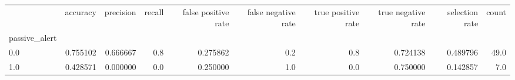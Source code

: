 \begin{tabular}{lrrrrrrrrr}
\toprule
{} &  accuracy &  precision &  recall &  false positive rate &  false negative rate &  true positive rate &  true negative rate &  selection rate &  count \\
passive\_alert &           &            &         &                      &                      &                     &                     &                 &        \\
\midrule
0.0           &  0.755102 &   0.666667 &     0.8 &             0.275862 &                  0.2 &                 0.8 &            0.724138 &        0.489796 &   49.0 \\
1.0           &  0.428571 &   0.000000 &     0.0 &             0.250000 &                  1.0 &                 0.0 &            0.750000 &        0.142857 &    7.0 \\
\bottomrule
\end{tabular}
